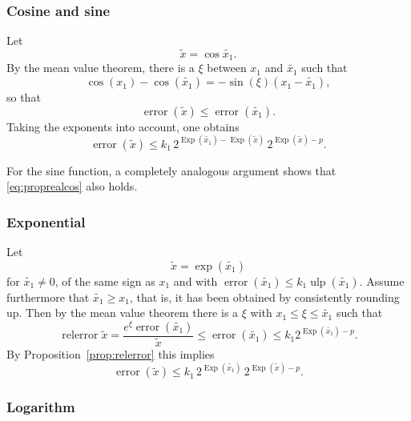 \documentclass [11pt]{article}
\newcommand {\corr}[1]{{#1}}
\newcommand {\appro}[1]{\widetilde {#1}}
\newcommand {\Ulp}{{\operatorname {ulp}}}
\DeclareMathOperator{\Exp}{\operatorname {Exp}}
\newcommand{\error}{\operatorname {error}}
\newcommand{\relerror}{\operatorname {relerror}}
\renewcommand {\leq}{\leqslant}
\renewcommand {\geq}{\geqslant}
\begin{document}
\subsubsection {Cosine and sine}
\label {sssec:proprealcossin}

Let
\[
\appro x = \cos {\appro {x_1}}.
\]
By the mean value theorem, there is a $\xi$ between $x_1$ and $\appro {x_1}$
such that
\[
\cos (x_1) - \cos (\appro {x_1}) = -\sin (\xi) (x_1 - \appro {x_1}),
\]
so that
\[
\error (\appro x)
\leq \error (\appro {x_1}).
\]
Taking the exponents into account, one obtains
\begin {equation}
\label {eq:proprealcos}
\error (\appro x)
\leq
k_1 \, 2^{\Exp (\appro {x_1}) - \Exp (\appro x)}
\, 2^{\Exp (\appro x) - p}.
\end {equation}

For the sine function, a completely analogous argument shows that
\eqref {eq:proprealcos} also holds.


\subsubsection {Exponential}
\label {sssec:proprealexp}

Let
\[
\appro x = \exp (\appro {x_1})
\]
for $\appro {x_1} \neq 0$, of the same sign as $\corr {x_1}$ and  with
$\error (\appro {x_1}) \leq k_1 \Ulp (\appro {x_1})$.
Assume furthermore that $\appro {x_1} \geq \corr {x_1}$, that is, it has
been obtained by consistently rounding up.
Then by the mean value theorem there is a $\xi$ with
$\corr {x_1} \leq \xi \leq \appro {x_1}$ such that
\[
\relerror {\appro x}
= \frac {e^\xi \error (\appro {x_1})}{\appro x}
\leq \error (\appro {x_1})
\leq k_1 2^{\Exp (\appro {x_1}) - p}.
\]
By Proposition~\ref {prop:relerror} this implies
\begin {equation}
\label {eq:proprealexp}
\error (\appro x)
\leq k_1 \, 2^{\Exp (\appro {x_1})} \, 2^{\Exp (\appro x) - p}.
\end {equation}


\subsubsection {Logarithm}
\label {sssec:propreallog}
\end{document}
